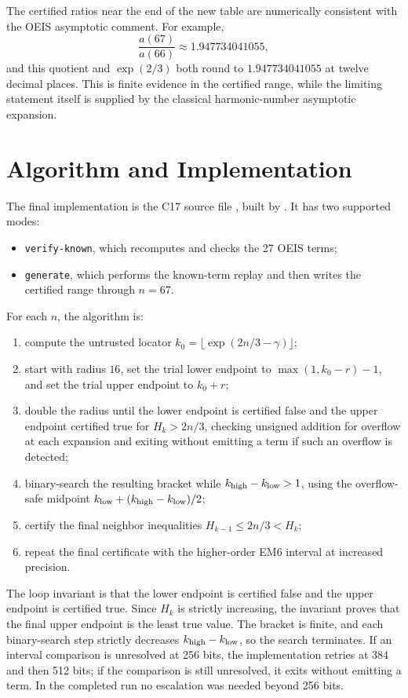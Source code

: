 \documentclass[11pt]{article}
\theoremstyle{definition}
\theoremstyle{remark}
\begin{document}
The certified ratios near the end of the new table are numerically consistent
with the OEIS asymptotic comment.  For example,
\[
  \frac{a(67)}{a(66)}\approx 1.947734041055,
\]
and this quotient and \(\exp(2/3)\) both round to \(1.947734041055\) at
twelve decimal places.  This is finite evidence in the certified range, while
the limiting statement itself is supplied by the classical harmonic-number
asymptotic expansion.

\section{Algorithm and Implementation}

The final implementation is the C17 source file , built by
.  It has two supported modes:
\begin{itemize}
\item \texttt{verify-known}, which recomputes and checks the 27 OEIS terms;
\item \texttt{generate}, which performs the known-term replay and then writes
      the certified range through \(n=67\).
\end{itemize}

For each \(n\), the algorithm is:
\begin{enumerate}
\item compute the untrusted locator \(k_0=\lfloor\exp(2n/3-\gamma)\rfloor\);
\item start with radius \(16\), set the trial lower endpoint to
      \(\max(1,k_0-r)-1\), and set the trial upper endpoint to \(k_0+r\);
\item double the radius until the lower endpoint is certified false and the
      upper endpoint certified true for \(H_k>2n/3\), checking unsigned
      addition for overflow at each expansion and exiting without emitting a
      term if such an overflow is detected;
\item binary-search the resulting bracket while \(k_{\rm high}-k_{\rm low}>1\),
      using the overflow-safe midpoint
      \(k_{\rm low}+(k_{\rm high}-k_{\rm low})/2\);
\item certify the final neighbor inequalities
      \(H_{k-1}\leq 2n/3 < H_k\);
\item repeat the final certificate with the higher-order EM6 interval at
      increased precision.
\end{enumerate}

The loop invariant is that the lower endpoint is certified false and the upper
endpoint is certified true.  Since \(H_k\) is strictly increasing, the
invariant proves that the final upper endpoint is the least true value.  The
bracket is finite, and each binary-search step strictly decreases
\(k_{\rm high}-k_{\rm low}\), so the search terminates.  If an interval
comparison is unresolved at 256 bits, the implementation retries at 384 and
then 512 bits; if the comparison is still unresolved, it exits without emitting
a term.  In the completed run no escalation was needed beyond 256 bits.
\end{document}
